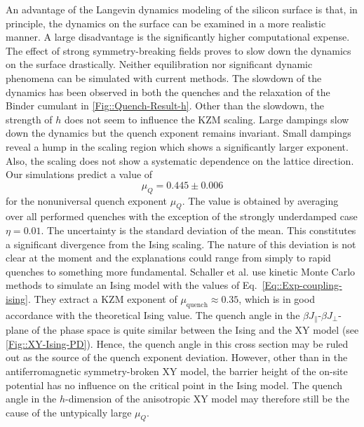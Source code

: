 	An advantage of the Langevin dynamics modeling of the silicon surface is that, in principle, the dynamics on the surface can be examined in a more realistic manner. A large disadvantage is the significantly higher computational expense. The effect of strong symmetry-breaking fields proves to slow down the dynamics on the surface drastically. Neither equilibration nor significant dynamic phenomena can be simulated with current methods. The slowdown of the dynamics has been observed in both the quenches and the relaxation of the Binder cumulant in \autoref{Fig::Quench-Result-h}. Other than the slowdown, the strength of $h$ does not seem to influence the KZM scaling. Large dampings slow down the dynamics but the quench exponent remains invariant. Small dampings reveal a hump in the scaling region which shows a significantly larger exponent. Also, the scaling does not show a systematic dependence on the lattice direction. Our simulations predict a value of  
	\begin{equation}
		\mu_{Q} =	0.445 \pm 0.006
	\end{equation}
	for the nonuniversal quench exponent $\mu_{Q}$. The value is obtained by averaging over all performed quenches with the exception of the strongly underdamped case $\eta =	0.01$. The uncertainty is the standard deviation of the mean. This constitutes a significant divergence from the Ising scaling. The nature of this deviation is not clear at the moment and the explanations could range from simply to rapid quenches to something more fundamental. Schaller et al. \cite{schaller2023sequential} use kinetic Monte Carlo methods to simulate an Ising model with the values of Eq.~\eqref{Eq::Exp-coupling-ising}. They extract a KZM exponent of $\mu_{\text{quench}} \approx	0.35$, which is in good accordance with the theoretical Ising value. The quench angle in the $\beta J_\parallel$-$\beta J_\perp$-plane of the phase space is quite similar between the Ising and the XY model (see \autoref{Fig::XY-Ising-PD}). Hence, the quench angle in this cross section may be ruled out as the source of the quench exponent deviation. However, other than in the antiferromagnetic symmetry-broken XY model, the barrier height of the on-site potential has no influence on the critical point in the Ising model. The quench angle in the $h$-dimension of the anisotropic XY model may therefore still be the cause of the untypically large $\mu_Q$. \\
	
